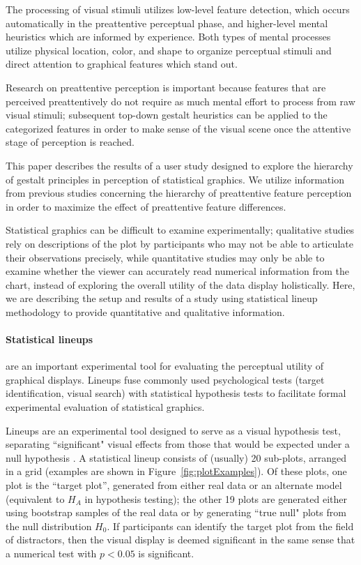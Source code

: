 \documentclass[12pt]{article}\usepackage[]{graphicx}\usepackage[]{color}
\begin{document}
The processing of visual stimuli utilizes low-level feature detection, which occurs automatically in the preattentive perceptual phase, and higher-level mental heuristics which are informed by experience. Both types of mental processes utilize physical location, color, and shape  to organize perceptual stimuli and direct attention to graphical features which stand out. 

Research on preattentive perception is important because features that are perceived preattentively do not require as much mental effort to process from raw visual stimuli; subsequent top-down gestalt heuristics can be applied to the categorized features in order to make sense of the visual scene once the attentive stage of perception is reached. 


This paper describes the results of a user study designed to explore the hierarchy of gestalt principles in perception of statistical graphics. We utilize information from previous studies \citep{heer:2014, robinson:03, healey1996high} concerning the hierarchy of preattentive feature perception in order to maximize the effect of preattentive feature differences. 


Statistical graphics can be difficult to examine experimentally; qualitative studies rely on descriptions of the plot by participants who may not be able to articulate their observations precisely, while quantitative studies may only be able to examine whether the viewer can accurately read numerical information from the chart, instead of exploring the overall utility of the data display holistically. Here, we are describing the setup and results of a study using statistical lineup methodology to provide quantitative and qualitative information.

\paragraph{Statistical lineups} 
are an important experimental tool for evaluating the perceptual utility of graphical displays. Lineups fuse commonly used psychological tests (target identification, visual search) \citep{visualreasoning} with statistical hypothesis tests to facilitate formal experimental evaluation of statistical graphics. 

Lineups are an experimental tool designed to serve as a visual hypothesis test, separating ``significant" visual effects from those that would be expected under a null hypothesis \citep{buja2009statistical, majumder2013validation,hofmann2012graphical, wickham2010graphical}. 
A statistical lineup consists of (usually) 20 sub-plots, arranged in a grid (examples are shown in Figure~\ref{fig:plotExamples}). 
Of these plots, one plot is the ``target plot'', generated from either real data or an alternate model (equivalent to $H_A$ in hypothesis testing); the other 19 plots are generated either using bootstrap samples of the real data or by generating ``true null" plots from the null distribution $H_0$. 
If participants can identify the target plot from the field of distractors, then the visual display is deemed significant in the same sense that a numerical test with $p<0.05$ is significant. 
\end{document}
